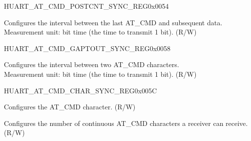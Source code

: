 \begin{register}{H}{UART\_AT\_CMD\_POSTCNT\_SYNC\_REG}{0x0054}\label{regdesc:UARTATCMDPOSTCNTSYNCREG}
%
%
\regnewline%
\begin{regdesc}\begin{reglist}
\label{fielddesc:UARTPOSTIDLENUM}\item [UART\_POST\_IDLE\_NUM] Configures the interval between the last AT\_CMD and subsequent data.\\Measurement unit: bit time (the time to transmit 1 bit). (R/W)
\end{reglist}\end{regdesc}
\end{register}


\begin{register}{H}{UART\_AT\_CMD\_GAPTOUT\_SYNC\_REG}{0x0058}\label{regdesc:UARTATCMDGAPTOUTSYNCREG}
%
%
\regnewline%
\begin{regdesc}\begin{reglist}
\label{fielddesc:UARTRXGAPTOUT}\item [UART\_RX\_GAP\_TOUT] Configures the interval between two AT\_CMD characters.\\Measurement unit: bit time (the time to transmit 1 bit). (R/W)
\end{reglist}\end{regdesc}
\end{register}


\begin{register}{H}{UART\_AT\_CMD\_CHAR\_SYNC\_REG}{0x005C}\label{regdesc:UARTATCMDCHARSYNCREG}
%
%
%
\regnewline%
\begin{regdesc}\begin{reglist}
\label{fielddesc:UARTATCMDCHAR}\item [UART\_AT\_CMD\_CHAR] Configures the AT\_CMD character. (R/W)
\label{fielddesc:UARTCHARNUM}\item [UART\_CHAR\_NUM] Configures the number of continuous AT\_CMD characters a receiver can receive. (R/W)
\end{reglist}\end{regdesc}
\end{register}


